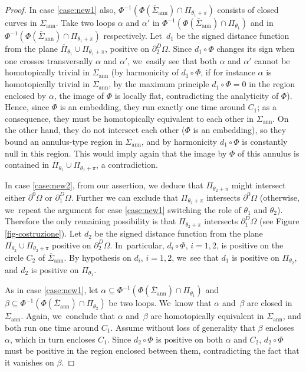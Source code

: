 \documentclass[JEP,XML,SOM,Unicode, NoFloatCountersInSection,published]{cedram}
\let\Om\Omega
\newcommand{\openannulus}{\Sigma_\mathrm{ann}}
\newcommand{\immclosedann}{\Phi({\overline\Sigma}_\mathrm{ann})}
\theoremstyle{definition}
\begin{document}
\begin{proof}
In case \ref{case:new1} also, $\Phi^{-1}(\immclosedann\cap \Pi_{\theta_1+\pi})$ consists of closed curves in $\openannulus$.
Take two loops $\alpha$ and $\alpha'$ in $ \Phi^{-1}(
\immclosedann\cap \Pi_{\theta_1})$ and in $ \Phi^{-1}(
\immclosedann\cap \Pi_{\theta_1+\pi})$ respectively.
Let~$d_1$ be the signed distance function from the plane $\overline\Pi_{\theta_1}\cup\Pi_{\theta_1+\pi}$, positive on $\partial_2^D\Om$. Since $d_1\circ\Phi$ changes its sign when one crosses
transversally $\alpha$ and $\alpha'$, we~easily see that both $\alpha$ and $\alpha'$ cannot be homotopically trivial in $\openannulus$ (by harmonicity of $d_1\circ\Phi$, if for instance $\alpha $ is homotopically trivial in $\openannulus$, by the maximum principle $d_1\circ\Phi=0$ in the region enclosed by $\alpha$, \ie the image of $\Phi$ is locally flat, contradicting the analyticity of $\Phi$). Hence, since $\Phi$ is an embedding, they run exactly one time around $C_1$; as a consequence, they must be homotopically equivalent to each other in $\openannulus$. On the other hand, they do not intersect each other
($\Phi$ is an embedding), so they bound an annulus-type region in $\openannulus$, and by harmonicity $d_1\circ\Phi$ is constantly null in this region.
This would imply again that the image by $\Phi$ of this annulus is contained in $\overline \Pi_{\theta_1}\cup\Pi_{\theta_1+\pi}$, a contradiction.

In case \ref{case:new2}, from our assertion, we
deduce that $\Pi_{\theta_2+\pi}$ might intersect either $\partial^0\Om$ or $\partial^D_1\Om$.
Further we can exclude that $\Pi_{\theta_2+\pi}$ intersects $\partial^0\Om$ (otherwise, we~repeat the argument for case \ref{case:new1} switching the role of $\theta_1$ and $\theta_2$).
Therefore the only remaining possibility is that $\Pi_{\theta_2+\pi}$ intersects $\partial_1^D\Om$ (see Figure \ref{fig-costruzione}).
Let $d_2$ be the signed distance function from the plane $\overline{\Pi_{\theta_2}}\cup\Pi_{\theta_2+\pi}$ positive on $\partial_2^D\Om$. In~particular, $d_i\circ\Phi$, $i=1,2$, is positive on the circle $C_2$ of
$\overline\Sigma_\mathrm{ann}$. By hypothesis on $d_i$, $i=1,2$, we~see that $d_1$ is positive on $\Pi_{\theta_2}$, and $d_2$ is positive on $\Pi_{\theta_1}$.

As in case \ref{case:new1}, let $\alpha\subseteq \Phi^{-1}(\immclosedann\cap \Pi_{\theta_1})$ and
$\beta\subseteq \Phi^{-1}(\immclosedann\cap \Pi_{\theta_2})$
be two loops. We~know that $\alpha$ and~$\beta$ are closed in $\openannulus$.
Again, we~conclude that $\alpha$ and~$\beta$ are homotopically equivalent in $\openannulus$, and both run one time around $C_1$. Assume without loss of generality that $\beta$ encloses $\alpha$, which in turn encloses $C_1$. Since $d_2\circ\Phi$ is positive on both $\alpha$ and $C_2$, $d_2\circ\Phi$ must be positive in the region enclosed between them, contradicting the fact that it
vanishes on $\beta$.


\end{proof}
\end{document}
